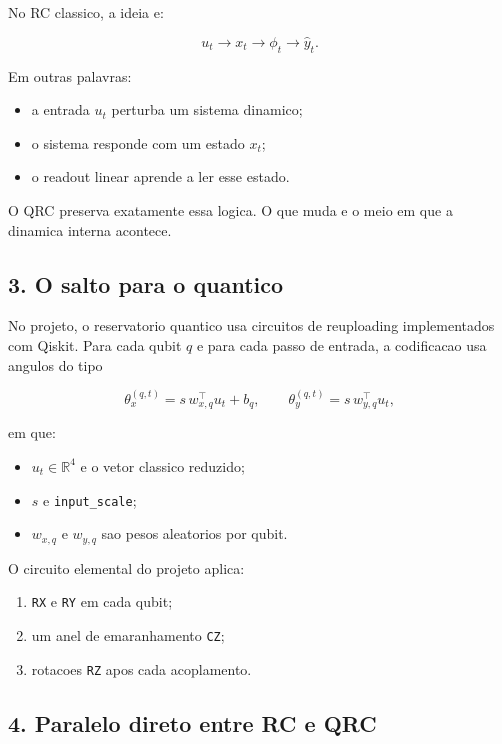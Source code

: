 \documentclass[12pt]{article}
\providecommand{\tightlist}{%
          \setlength{\itemsep}{0pt}\setlength{\parskip}{0pt}}
\begin{document}
No RC classico, a ideia e:

\[
u_t \longrightarrow x_t \longrightarrow \phi_t \longrightarrow \hat{y}_t.
\]

Em outras palavras:

\begin{itemize}
\tightlist
\item
  a entrada \(u_t\) perturba um sistema dinamico;
\item
  o sistema responde com um estado \(x_t\);
\item
  o readout linear aprende a ler esse estado.
\end{itemize}

O QRC preserva exatamente essa logica. O que muda e o meio em que a dinamica interna acontece.

\subsection{3. O salto para o quantico}\label{3-o-salto-para-o-quantico}

No projeto, o reservatorio quantico usa circuitos de reuploading implementados com Qiskit. Para cada qubit \(q\) e para cada passo de entrada, a codificacao usa angulos do tipo

\[
\theta^{(q,t)}_x = s \, w_{x,q}^\top u_t + b_q,
\qquad
\theta^{(q,t)}_y = s \, w_{y,q}^\top u_t,
\]

em que:

\begin{itemize}
\tightlist
\item
  \(u_t \in \mathbb{R}^4\) e o vetor classico reduzido;
\item
  \(s\) e \texttt{input\_scale};
\item
  \(w_{x,q}\) e \(w_{y,q}\) sao pesos aleatorios por qubit.
\end{itemize}

O circuito elemental do projeto aplica:

\begin{enumerate}
\def\labelenumi{\arabic{enumi}.}
\tightlist
\item
  \texttt{RX} e \texttt{RY} em cada qubit;
\item
  um anel de emaranhamento \texttt{CZ};
\item
  rotacoes \texttt{RZ} apos cada acoplamento.
\end{enumerate}

\subsection{4. Paralelo direto entre RC e QRC}\label{4-paralelo-direto-entre-rc-e-qrc}
\end{document}
